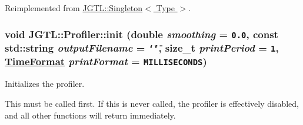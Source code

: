 Reimplemented from \hyperlink{class_j_g_t_l_1_1_singleton_59788c79ef7102b584b475aafc9e2315}{JGTL::Singleton$<$ Type $>$}.\hypertarget{class_j_g_t_l_1_1_profiler_6e7e7821f35ebd21a067e6ef133e367f}{
\subsubsection[init]{\setlength{\rightskip}{0pt plus 5cm}void JGTL::Profiler::init (double {\em smoothing} = {\tt 0.0}, const std::string {\em output\-Filename} = {\tt \char`\"{}\char`\"{}}, size\_\-t {\em print\-Period} = {\tt 1}, \hyperlink{namespace_j_g_t_l_11a34d88ecadd1c99354adc21fd5abe6}{Time\-Format} {\em print\-Format} = {\tt MILLISECONDS})}}
\label{class_j_g_t_l_1_1_profiler_6e7e7821f35ebd21a067e6ef133e367f}


Initializes the profiler.

This must be called first. If this is never called, the profiler is effectively disabled, and all other functions will return immediately.

